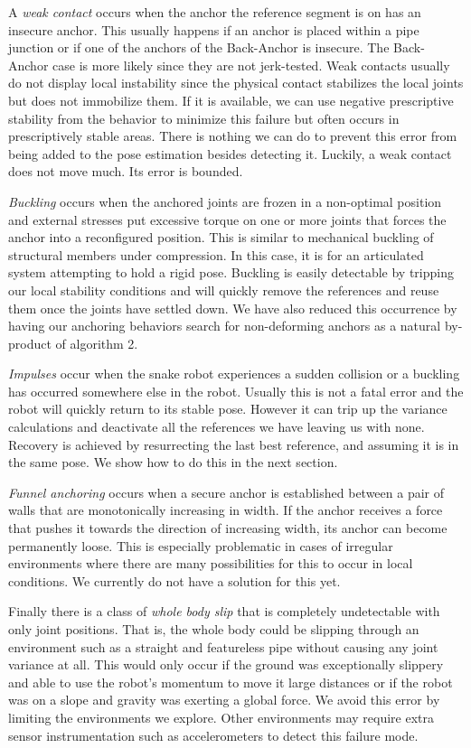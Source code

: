 A \emph{weak contact} occurs when the anchor the reference segment is on has an insecure anchor. This usually happens if an anchor is placed within a pipe junction or if one of the anchors of the Back-Anchor is insecure.  The Back-Anchor case is more likely since they are not jerk-tested.  Weak contacts usually do not display local instability since the physical contact stabilizes the local joints but does not immobilize them.  If it is available, we can use negative prescriptive stability from the behavior to minimize this failure but often occurs in prescriptively stable areas.  There is nothing we can do to prevent this error from being added to the pose estimation besides detecting it.  Luckily, a weak contact does not move much.  Its error is bounded.

\emph{Buckling} occurs when the anchored joints are frozen in a non-optimal position and external stresses put excessive torque on one or more joints that forces the anchor into a reconfigured position. This is similar to mechanical buckling of structural members under compression.  In this case, it is for an articulated system attempting to hold a rigid pose. Buckling is easily detectable by tripping our local stability conditions and will quickly remove the references and reuse them once the joints have settled down. We have also reduced this occurrence by having our anchoring behaviors search for non-deforming anchors as a natural by-product of algorithm 2.

\emph{Impulses} occur when the snake robot experiences a sudden collision or a buckling has occurred somewhere else in the robot. Usually this is not a fatal error and the robot will quickly return to its stable pose. However it can trip up the variance calculations and deactivate all the references we have leaving us with none. Recovery is achieved by resurrecting the last best reference, and assuming it is in the same pose.  We show how to do this in the next section.

\emph{Funnel anchoring} occurs when a secure anchor is established between a pair of walls that are monotonically increasing in width. If the anchor receives a force that pushes it towards the direction of increasing width, its anchor can become permanently loose. This is especially problematic in cases of irregular environments where there are many possibilities for this to occur in local conditions. We currently do not have a solution for this yet.

Finally there is a class of \emph{whole body slip} that is completely undetectable with only joint positions. That is, the whole body could be slipping through an environment such as a straight and featureless pipe without causing any joint variance at all. This would only occur if the ground was exceptionally slippery and able to use the robot's momentum to move it large distances or if the robot was on a slope and gravity was exerting a global force. We avoid this error by limiting the environments we explore. Other environments may require extra sensor instrumentation such as accelerometers to detect this failure mode.

